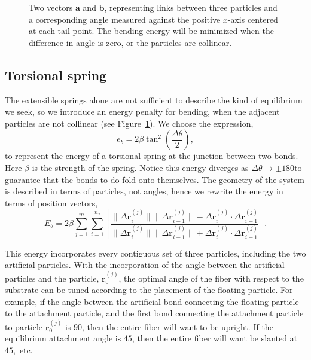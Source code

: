 	\begin{figure}[t]
		\begin{center}
			
		\end{center}		
		\caption{Two vectors $\textbf{a}$ and $\textbf{b}$, representing links between three particles and a corresponding angle measured against the positive $x$-axis centered at each tail point. The bending energy will be minimized when the difference in angle is zero, or the particles are collinear.
		\label{fig:BendingEnergy}}
	\end{figure}	

\subsection{Torsional spring}

	The extensible springs alone are not sufficient to describe the kind of equilibrium we seek, so we introduce an energy penalty for bending, when the adjacent particles are not collinear (see Figure~\ref{fig:BendingEnergy}). We choose the expression,
\begin{equation}
	e_b = 2\beta \tan^2 \left( \frac{\Delta \theta}{2} \right),
\end{equation}
to represent the energy of a torsional spring at the junction between two bonds. Here $\beta$ is the strength of the spring. Notice this energy diverges as $\Delta \theta \to \pm180$\textdegree to guarantee that the bonds to do fold onto themselves. The geometry of the system is described in terms of particles, not angles, hence we rewrite the energy in terms of position vectors,
\begin{equation}
	E_b = 2\beta \sum_{j=1}^m \sum_{i=1}^{n_j} \left[ \frac{\|\Delta \textbf{r}_i^{(j)} \| \|\Delta \textbf{r}_{i-1}^{(j)} \| - \Delta \textbf{r}_i^{(j)} \cdot \Delta \textbf{r}_{i-1}^{(j)}}{\|\Delta \textbf{r}_i^{(j)} \| \|\Delta \textbf{r}_{i-1}^{(j)} \| + \Delta \textbf{r}_i^{(j)} \cdot \Delta \textbf{r}_{i-1}^{(j)}} \right].
\end{equation}

	This energy incorporates every contiguous set of three particles, including the two artificial particles. With the incorporation of the angle between the artificial particles and the particle, $\textbf{r}_0^{(j)}$, the optimal angle of the fiber with respect to the substrate can be tuned according to the placement of the floating particle. For example, if the angle between the artificial bond connecting the floating particle to the attachment particle, and the first bond connecting the attachment particle to particle $\textbf{r}_0^{(j)}$ is $90$\textdegree, then the entire fiber will want to be upright. If the equilibrium attachment angle is $45$\textdegree, then the entire fiber will want be slanted at $45$\textdegree,~etc. 

